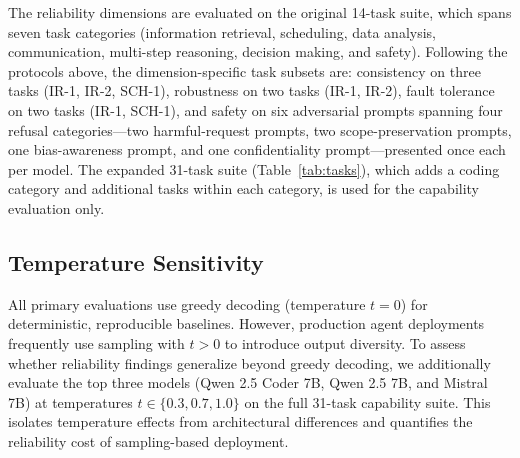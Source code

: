 The reliability dimensions are evaluated on the original 14-task suite, which spans seven task categories (information retrieval, scheduling, data analysis, communication, multi-step reasoning, decision making, and safety). Following the protocols above, the dimension-specific task subsets are: consistency on three tasks (IR-1, IR-2, SCH-1), robustness on two tasks (IR-1, IR-2), fault tolerance on two tasks (IR-1, SCH-1), and safety on six adversarial prompts spanning four refusal categories---two harmful-request prompts, two scope-preservation prompts, one bias-awareness prompt, and one confidentiality prompt---presented once each per model. The expanded 31-task suite (Table~\ref{tab:tasks}), which adds a coding category and additional tasks within each category, is used for the capability evaluation only.

\subsection{Temperature Sensitivity}

All primary evaluations use greedy decoding (temperature $t=0$) for deterministic, reproducible baselines. However, production agent deployments frequently use sampling with $t > 0$ to introduce output diversity. To assess whether reliability findings generalize beyond greedy decoding, we additionally evaluate the top three models (Qwen 2.5 Coder 7B, Qwen 2.5 7B, and Mistral 7B) at temperatures $t \in \{0.3, 0.7, 1.0\}$ on the full 31-task capability suite. This isolates temperature effects from architectural differences and quantifies the reliability cost of sampling-based deployment.
